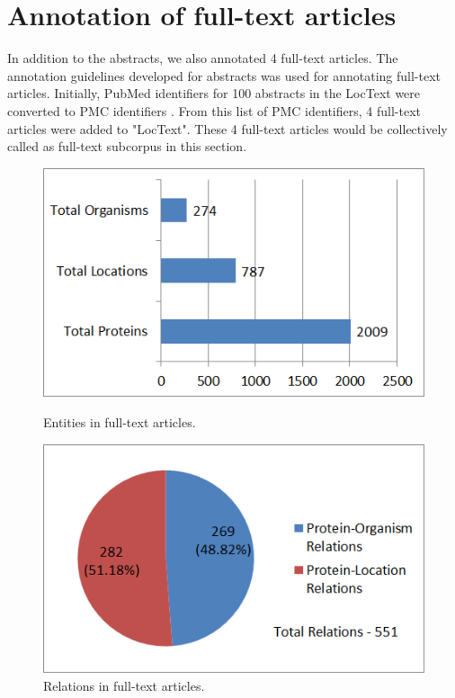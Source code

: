 \section{Annotation of full-text articles} \label{sec:full-text}

In addition to the abstracts, we also annotated 4 full-text articles. The annotation guidelines developed for abstracts was used for annotating full-text articles. Initially, PubMed identifiers for 100 abstracts in the LocText were converted to PMC identifiers \cite{pubmedtopmc}. From this list of PMC identifiers, 4 full-text articles were added to "LocText". These 4 full-text articles would be collectively called as full-text subcorpus in this section.

\begin{figure}
\centering
\begin{minipage}{.5\textwidth}
  \centering
  \includegraphics[width=.95\textwidth]{figures/1_FullTextEntities.png}
  \caption{Entities in full-text articles.}
  \label{fig:FT_entities}
\end{minipage}%
\begin{minipage}{.5\textwidth}
  \centering
  \includegraphics[width=.95\textwidth]{figures/1_FullTextRelationDistribution.png}
  \caption{Relations in full-text articles.}
  \label{fig:FT_relations}
\end{minipage}
\end{figure}

